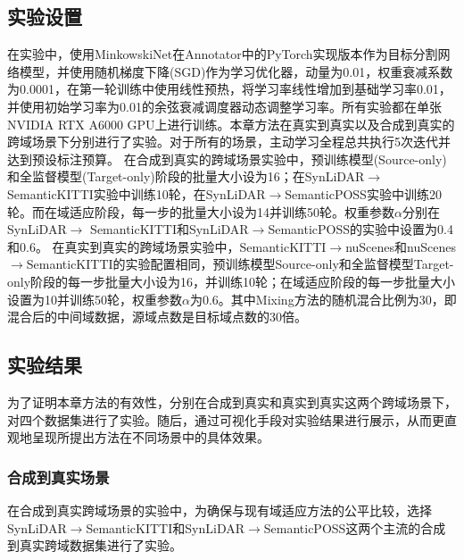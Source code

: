 \subsection{实验设置}
在实验中，使用MinkowskiNet在Annotator中的PyTorch实现版本作为目标分割网络模型，并使用随机梯度下降(SGD)作为学习优化器，动量为0.01，权重衰减系数为0.0001，在第一轮训练中使用线性预热，将学习率线性增加到基础学习率0.01，并使用初始学习率为0.01的余弦衰减调度器动态调整学习率。所有实验都在单张NVIDIA RTX A6000 GPU上进行训练。本章方法在真实到真实以及合成到真实的跨域场景下分别进行了实验。对于所有的场景，主动学习全程总共执行5次迭代并达到预设标注预算。
在合成到真实的跨域场景实验中，预训练模型(Source-only)和全监督模型(Target-only)阶段的批量大小设为16；在SynLiDAR$\to$SemanticKITTI实验中训练10轮，在SynLiDAR$\to$SemanticPOSS实验中训练20轮。而在域适应阶段，每一步的批量大小设为14并训练50轮。权重参数$\alpha$分别在SynLiDAR$\to$ SemanticKITTI和SynLiDAR$\to$SemanticPOSS的实验中设置为0.4和0.6。
在真实到真实的跨域场景实验中，SemanticKITTI$\to$nuScenes和nuScenes$\to$SemanticKITTI的实验配置相同，预训练模型Source-only和全监督模型Target-only阶段的每一步批量大小设为16，并训练10轮；在域适应阶段的每一步批量大小设置为10并训练50轮，权重参数$\alpha$为0.6。其中Mixing方法的随机混合比例为30，即混合后的中间域数据，源域点数是目标域点数的30倍。
\subsection{实验结果}
为了证明本章方法的有效性，分别在合成到真实和真实到真实这两个跨域场景下，对四个数据集进行了实验。随后，通过可视化手段对实验结果进行展示，从而更直观地呈现所提出方法在不同场景中的具体效果。
\subsubsection{合成到真实场景}
在合成到真实跨域场景的实验中，为确保与现有域适应方法的公平比较，选择SynLiDAR\(\to\)SemanticKITTI和SynLiDAR\(\to\)SemanticPOSS这两个主流的合成到真实跨域数据集进行了实验。
\vspace{0.1cm}


